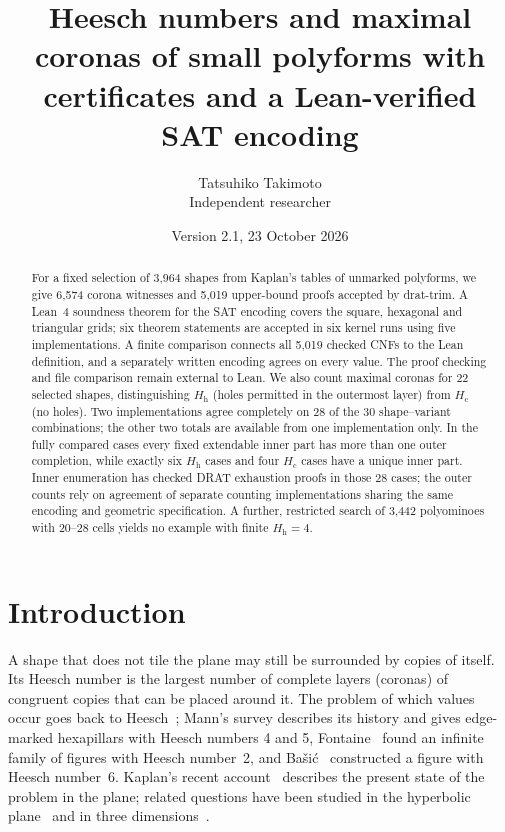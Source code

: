 \documentclass[10pt,a4paper]{article}
\title{Heesch numbers and maximal coronas of small polyforms\newline
with certificates and a Lean-verified SAT encoding}
\author{Tatsuhiko Takimoto\\\small Independent researcher}
\date{Version 2.1, 23 October 2026}
\theoremstyle{definition}
\theoremstyle{remark}
\newcommand{\Hc}{H_{\mathrm c}}
\newcommand{\Hh}{H_{\mathrm h}}
\begin{document}
\maketitle
\begin{abstract}
For a fixed selection of 3,964 shapes from Kaplan's tables of unmarked
polyforms, we give 6,574 corona witnesses and 5,019 upper-bound proofs
accepted by drat-trim. A Lean~4 soundness theorem for the SAT encoding
covers the square, hexagonal and triangular grids; six theorem statements
are accepted in six kernel runs using five implementations. A finite
comparison connects all 5,019 checked CNFs to the Lean definition, and a
separately written encoding agrees on every value. The proof checking
and file comparison remain external to Lean.
We also count maximal coronas for 22 selected shapes, distinguishing
$\Hh$ (holes permitted in the outermost layer) from $\Hc$ (no holes).
Two implementations agree completely on 28 of the 30 shape--variant
combinations; the other two totals are available from one implementation
only. In the fully compared cases every fixed extendable inner part has
more than one outer completion, while exactly six $\Hh$ cases and four
$\Hc$ cases have a unique inner part. Inner enumeration has checked DRAT
exhaustion proofs in those 28 cases; the outer counts rely on agreement
of separate counting implementations sharing the same encoding and
geometric specification. A further, restricted search of 3,442
polyominoes with 20--28 cells yields no example with finite $\Hh=4$.
\end{abstract}

\section{Introduction}
\label{sec:intro}
A shape that does not tile the plane may still be surrounded by copies of
itself. Its Heesch number is the largest number of complete layers
(coronas) of congruent copies that can be placed around it. The problem of
which values occur goes back to Heesch~\cite{Heesch}; Mann's survey
\cite{Mann} describes its history and gives edge-marked hexapillars with
Heesch numbers 4 and 5, Fontaine~\cite{Fontaine} found an infinite family of figures with
Heesch number~2, and Ba\v{s}i\'c~\cite{Basic21} constructed a figure with Heesch
number~6. Kaplan's recent account~\cite{Kaplan25} describes the present
state of the problem in the plane; related questions have been studied in
the hyperbolic plane~\cite{Maiti} and in three dimensions~\cite{Basic26}.
\end{document}

